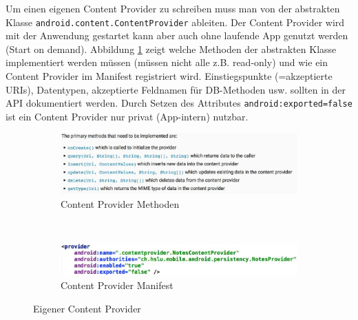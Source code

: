 Um einen eigenen Content Provider zu schreiben muss man von der abstrakten Klasse \texttt{android.content.ContentProvider} ableiten. Der Content Provider wird mit der Anwendung gestartet kann aber auch ohne laufende App genutzt werden (Start on demand). Abbildung \ref{fig:own-content-provider} zeigt welche Methoden der abstrakten Klasse implementiert werden müssen (müssen nicht alle z.B. read-only) und wie ein Content Provider im Manifest registriert wird. Einstiegspunkte (=akzeptierte URIs), Datentypen, akzeptierte Feldnamen für DB-Methoden usw. sollten in der API dokumentiert werden. Durch Setzen des Attributes \texttt{android:exported=false} ist ein Content Provider nur privat (App-intern) nutzbar.

\begin{figure}
	\centering
	\begin{subfigure}[b]{0.4\textwidth}
		\includegraphics[width=\textwidth]{fig/content-provider-methods}
		\caption{Content Provider Methoden}
	\end{subfigure}
	~
	\begin{subfigure}[b]{0.4\textwidth}
		\includegraphics[width=\textwidth]{fig/content-provider-manifest}
		\caption{Content Provider Manifest}
	\end{subfigure}
	\caption{Eigener Content Provider}
	\label{fig:own-content-provider}
\end{figure}
